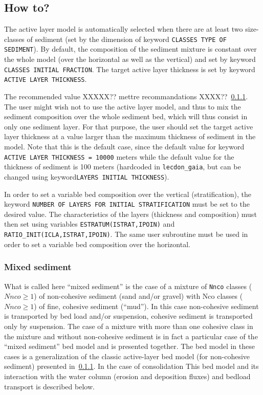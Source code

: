 \subsection{How to?}
The active layer model is automatically selected when there are at least two size-classes of sediment (set by the dimension of keyword \texttt{CLASSES TYPE OF SEDIMENT}). 
By default, the composition of the sediment mixture is constant over the whole model (over the horizontal as well as the vertical) and set by keyword \texttt{CLASSES INITIAL FRACTION}.
The target active layer thickness is set by keyword \texttt{ACTIVE LAYER THICKNESS}.

The recommended value XXXXX?? mettre recommandations XXXX??~\ref{}. The user might wish not to use the active layer model, and thus to mix the sediment composition over the whole sediment bed, which will thus consist in only one sediment layer. For that purpose, the user should set the target active layer thickness at a value larger than the maximum thickness of sediment in the model. Note that this is the default case, since the default value for keyword \texttt{ACTIVE LAYER THICKNESS = 10000} meters while the default value for the thickness of sediment is 100 meters (hardcoded in \texttt{lecdon\_gaia}, but can be changed using keyword\texttt{LAYERS INITIAL THICKNESS}). 

In order to set a variable bed composition over the vertical (stratification), the keyword \texttt{NUMBER OF LAYERS FOR INITIAL STRATIFICATION} must be set to the desired value. The characteristics of the layers (thickness and composition) must then set using variables \texttt{ESTRATUM(ISTRAT,IPOIN)} and \texttt{RATIO\_INIT(ICLA,ISTRAT,IPOIN)}.
The same user subroutine must be used in order to set a variable bed composition over the horizontal.

\subsubsection{Mixed sediment}
What is called here ``mixed sediment'' is the case of a mixture of \texttt{Nnco} classes ($Nnco \geq 1$) of non-cohesive sediment (sand and/or gravel) with Nco classes ($Nnco \geq 1$) of fine, cohesive sediment (``mud''). In this case non-cohesive sediment is transported by bed load and/or suspension, cohesive sediment is transported only by suspension.
The case of a mixture with more than one cohesive class in the mixture and without non-cohesive sediment is in fact a particular case of the ``mixed sediment'' bed model and is presented together.
The bed model in these cases is a generalization of the classic active-layer bed model (for non-cohesive sediment) presented in~\ref{}. In the case of consolidation 
This bed model and its interaction with the water column (erosion and deposition fluxes) and bedload transport is described below.


